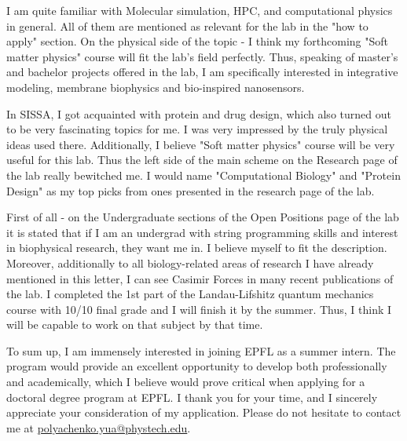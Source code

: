 \documentclass[12pt, a4paper]{awesome-cv}
\begin{document}
\begin{cvletter}
\newpage

I am quite familiar with Molecular simulation, HPC, and computational physics in general. All of them are mentioned as relevant for the lab in the "how to apply" section. On the physical side of the topic - I think my forthcoming "Soft matter physics" course will fit the lab's field perfectly. Thus, speaking of master's and bachelor projects offered in the lab, I am specifically interested in integrative modeling, membrane biophysics and bio-inspired nanosensors.

In SISSA, I got acquainted with protein and drug design, which also turned out to be very fascinating topics for me. I was very impressed by the truly physical ideas used there. Additionally, I believe "Soft matter physics" course will be very useful for this lab. Thus the left side of the main scheme on the Research page of the lab really bewitched me. I would name "Computational Biology" and "Protein Design" as my top picks from ones presented in the research page of the lab.

First of all - on the Undergraduate sections of the Open Positions page of the lab it is stated that if I am an undergrad with string programming skills and interest in biophysical research, they want me in. I believe myself to fit the description. Moreover, additionally to all biology-related areas of research I have already mentioned in this letter, I can see Casimir Forces in many recent publications of the lab. I completed the 1st part of the Landau-Lifshitz quantum mechanics course with 10/10 final grade and I will finish it by the summer. Thus, I think I will be capable to work on that subject by that time.


\end{cvletter}


To sum up, I am immensely interested in joining EPFL as a summer intern. The program would provide an excellent opportunity to develop both professionally and academically, which I believe would prove critical when applying for a doctoral degree program at EPFL. I thank you for your time, and I sincerely appreciate your consideration of my application. Please do not hesitate to contact me at  \href{mailto:polyachenko.yua@phystech.edu}{polyachenko.yua@phystech.edu}.

\makeletterclosing
\end{document}

